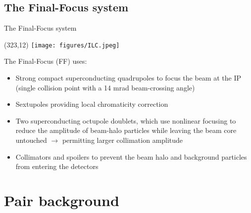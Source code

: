\documentclass[xcolor={dvipsnames}]{beamer}
\newcommand{\ilclogo}{
  \setlength{\TPHorizModule}{1pt}
  \setlength{\TPVertModule}{1pt}
  \begin{textblock}{1}(323,12)
   \texttt{[image: figures/ILC.jpeg]}
  \end{textblock}
}
\begin{document}
\subsection{The Final-Focus system}
\begin{frame}{The Final-Focus system}
 \ilclogo
 The Final-Focus (FF) uses:
\begin{itemize}
 \item Strong compact superconducting quadrupoles to focus the
beam at the IP (single collision point with a 14 mrad beam-crossing angle)
\item Sextupoles providing local chromaticity correction
\item Two superconducting octupole doublets, which use nonlinear
focusing to reduce the amplitude of beam-halo particles while leaving the beam core untouched $\rightarrow$ permitting larger collimation amplitude
\item Collimators and spoilers to prevent the beam halo and background particles from entering the detectors
\end{itemize}
\end{frame}

\section{Pair background}
\end{document}
